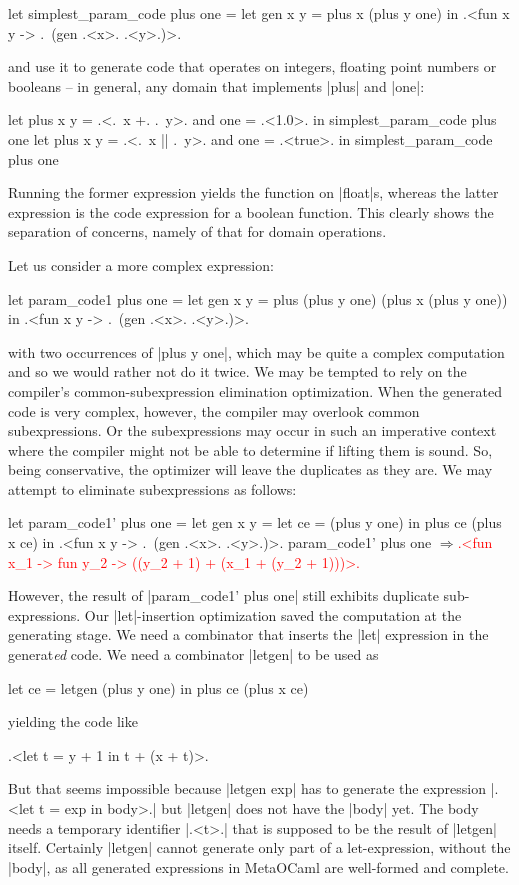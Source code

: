 \documentclass[draft]{elsart}
\newcommand{\evalresult}[1]{\ensuremath{\Longrightarrow}\textcolor{red}{#1}}
\begin{document}
\begin{code}
let simplest_param_code plus one =
  let gen x y = plus x (plus y one) in
  .<fun x y -> .~(gen .<x>. .<y>.)>.
\end{code}
and use it to generate code that operates on integers, floating point
numbers or booleans -- in general, any domain that implements |plus|
and |one|:
\begin{code}
let plus x y = .<.~x +. .~y>. and one = .<1.0>. in
  simplest_param_code plus one
let plus x y = .<.~x || .~y>. and one = .<true>. in
  simplest_param_code plus one
\end{code}
Running the former expression yields the function on |float|s, whereas
the latter expression is the code expression for a boolean function.
This clearly shows the separation of concerns, namely of that for domain
operations.

Let us consider a more complex expression:
\begin{code}
let param_code1 plus one =
  let gen x y = plus (plus y one) (plus x (plus y one)) in
  .<fun x y -> .~(gen .<x>. .<y>.)>.
\end{code}
with two occurrences of |plus y one|,
which may be quite a complex computation and so we would rather not do
it twice. We may be tempted to rely on the compiler's
common-subexpression elimination optimization. When the generated code is
very complex, however, the compiler may overlook common subexpressions.  Or the
subexpressions may occur in such an imperative context where the compiler
might not be able to determine if lifting them is sound. So, being
conservative, the optimizer will leave the duplicates as they are. 
We may attempt to eliminate subexpressions as follows: 
\begin{code}
let param_code1' plus one =
  let gen x y = let ce = (plus y one) in  plus ce (plus x ce) in
  .<fun x y -> .~(gen .<x>. .<y>.)>.
param_code1' plus one
\evalresult{.<fun x_1 -> fun y_2 -> ((y_2 + 1) + (x_1 + (y_2 + 1)))>.}
\end{code}
However,
the result of |param_code1' plus one| still exhibits duplicate
sub-expressions.  Our |let|-insertion optimization saved the
computation at the generating stage.  We need a combinator that
inserts the |let| expression in the generat\emph{ed} code. We need a
combinator |letgen| to be used as
\begin{code}
let ce = letgen (plus y one) in plus ce (plus x ce)
\end{code}
yielding the code like 
\begin{code}
.<let t = y + 1 in t + (x + t)>.
\end{code}
But that seems impossible because |letgen exp| has to generate
the expression |.<let t = exp in body>.| but |letgen| does not
have the |body| yet. The body needs a temporary identifier |.<t>.|
that is supposed to be the result of |letgen| itself.  Certainly
|letgen| cannot generate only part of a let-expression, without the
|body|, as all generated expressions in MetaOCaml are well-formed and
complete.
\end{document}
